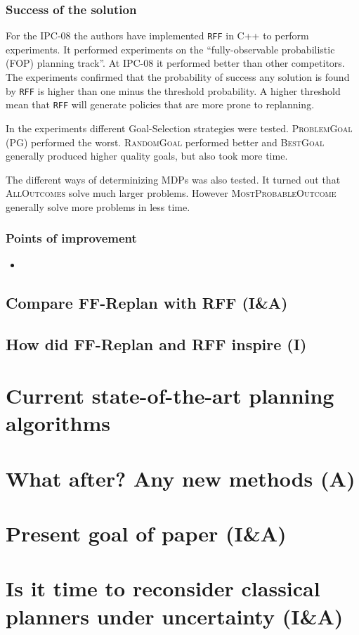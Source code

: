 \documentclass[runningheads,a4paper]{llncs}
\begin{document}
\subsubsection{Success of the solution}

For the IPC-08 the authors have implemented \texttt{RFF} in C++ to perform
experiments. It performed experiments on the ``fully-observable probabilistic
(FOP) planning track''. At IPC-08 it performed better than other competitors.
The experiments confirmed that the probability of success any solution is found
by \texttt{RFF} is higher than one minus the threshold probability. A higher
threshold mean that \texttt{RFF} will generate policies that are more prone to
replanning.

In the experiments different Goal-Selection strategies were tested.
\textsc{ProblemGoal} (PG) performed the worst. \textsc{RandomGoal} performed
better and \textsc{BestGoal} generally produced higher quality goals, but also
took more time.

The different ways of determinizing MDPs was also tested. It turned out that
\textsc{AllOutcomes} solve much larger problems. However
\textsc{MostProbableOutcome} generally solve more problems in less time.

\subsubsection{Points of improvement}

\begin{itemize}
	\item
\end{itemize}

\subsection{Compare FF-Replan with RFF (I\&A)}

\subsection{How did FF-Replan and RFF inspire (I)}

\section{Current state-of-the-art planning algorithms}

\section{What after? Any new methods (A)}

\section{Present goal of paper (I\&A)}

\section{Is it time to reconsider classical planners under uncertainty (I\&A)}



\end{document}
